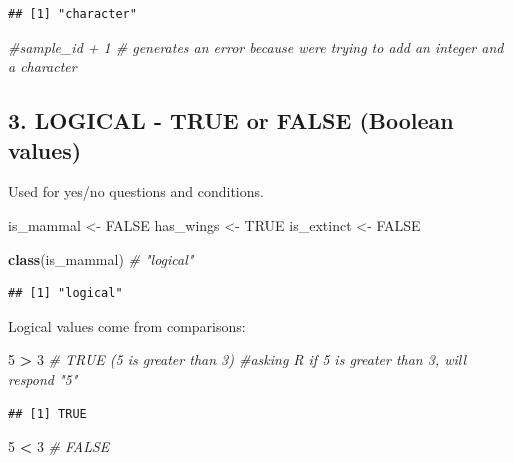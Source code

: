\documentclass[
]{article}
\newenvironment{Shaded}{\begin{snugshade}}{\end{snugshade}}
\newcommand{\CommentTok}[1]{\textcolor[rgb]{0.56,0.35,0.01}{\textit{#1}}}
\newcommand{\ConstantTok}[1]{\textcolor[rgb]{0.56,0.35,0.01}{#1}}
\newcommand{\DecValTok}[1]{\textcolor[rgb]{0.00,0.00,0.81}{#1}}
\newcommand{\FunctionTok}[1]{\textcolor[rgb]{0.13,0.29,0.53}{\textbf{#1}}}
\newcommand{\NormalTok}[1]{#1}
\newcommand{\OtherTok}[1]{\textcolor[rgb]{0.56,0.35,0.01}{#1}}
\newcommand{\SpecialCharTok}[1]{\textcolor[rgb]{0.81,0.36,0.00}{\textbf{#1}}}
\begin{document}
\begin{verbatim}
## [1] "character"
\end{verbatim}

\begin{Shaded}
\begin{Highlighting}[]
\CommentTok{\#sample\_id + 1  \# generates an error because we\textquotesingle{}re trying to add an integer and a character}
\end{Highlighting}
\end{Shaded}

\subsection{3. LOGICAL - TRUE or FALSE (Boolean
values)}\label{logical---true-or-false-boolean-values}

Used for yes/no questions and conditions.

\begin{Shaded}
\begin{Highlighting}[]
\NormalTok{is\_mammal }\OtherTok{\textless{}{-}} \ConstantTok{FALSE}
\NormalTok{has\_wings }\OtherTok{\textless{}{-}} \ConstantTok{TRUE}
\NormalTok{is\_extinct }\OtherTok{\textless{}{-}} \ConstantTok{FALSE}

\FunctionTok{class}\NormalTok{(is\_mammal)  }\CommentTok{\# "logical"}
\end{Highlighting}
\end{Shaded}

\begin{verbatim}
## [1] "logical"
\end{verbatim}

Logical values come from comparisons:

\begin{Shaded}
\begin{Highlighting}[]
\DecValTok{5} \SpecialCharTok{\textgreater{}} \DecValTok{3}         \CommentTok{\# TRUE (5 is greater than 3) \#asking R if 5 is greater than 3, will respond "5"}
\end{Highlighting}
\end{Shaded}

\begin{verbatim}
## [1] TRUE
\end{verbatim}

\begin{Shaded}
\begin{Highlighting}[]
\DecValTok{5} \SpecialCharTok{\textless{}} \DecValTok{3}         \CommentTok{\# FALSE}
\end{Highlighting}
\end{Shaded}
\end{document}
